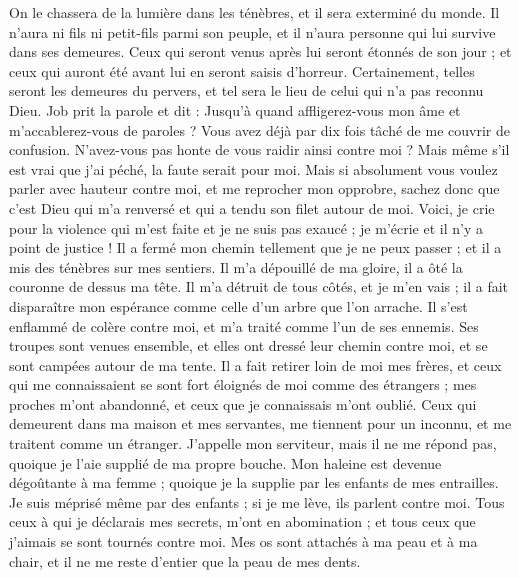 \begin{multicols}{2}
On le chassera de la lumière dans les ténèbres, et il sera exterminé du monde. 
Il n'aura ni fils ni petit-fils parmi son peuple, et il n'aura personne qui lui survive dans ses demeures. 
Ceux qui seront venus après lui seront étonnés de son jour ; et ceux qui auront été avant lui en seront saisis d'horreur. 
Certainement, telles seront les demeures du pervers, et tel sera le lieu de celui qui n'a pas reconnu Dieu.
\VerseOne{}Job prit la parole et dit :
Jusqu'à quand affligerez-vous mon âme et m'accablerez-vous de paroles ? 
Vous avez déjà par dix fois tâché de me couvrir de confusion. N'avez-vous pas honte de vous raidir ainsi contre moi ? 
Mais même s'il est vrai que j'ai péché, la faute serait pour moi. 
Mais si absolument vous voulez parler avec hauteur contre moi, et me reprocher mon opprobre, 
sachez donc que c'est Dieu qui m'a renversé et qui a tendu son filet autour de moi. 
Voici, je crie pour la violence qui m'est faite et je ne suis pas exaucé ; je m'écrie et il n'y a point de justice !
Il a fermé mon chemin tellement que je ne peux passer ; et il a mis des ténèbres sur mes sentiers. 
Il m'a dépouillé de ma gloire, il a ôté la couronne de dessus ma tête.
Il m'a détruit de tous côtés, et je m'en vais ; il a fait disparaître mon espérance comme celle d'un arbre que l'on arrache. 
Il s'est enflammé de colère contre moi, et m'a traité comme l'un de ses ennemis.
Ses troupes sont venues ensemble, et elles ont dressé leur chemin contre moi, et se sont campées autour de ma tente.
Il a fait retirer loin de moi mes frères, et ceux qui me connaissaient se sont fort éloignés de moi comme des étrangers ;
mes proches m'ont abandonné, et ceux que je connaissais m'ont oublié.
Ceux qui demeurent dans ma maison et mes servantes, me tiennent pour un inconnu, et me traitent comme un étranger. 
J'appelle mon serviteur, mais il ne me répond pas, quoique je l'aie supplié de ma propre bouche.
Mon haleine est devenue dégoûtante à ma femme ; quoique je la supplie par les enfants de mes entrailles.
Je suis méprisé même par des enfants ; si je me lève, ils parlent contre moi.
Tous ceux à qui je déclarais mes secrets, m'ont en abomination ; et tous ceux que j'aimais se sont tournés contre moi.
Mes os sont attachés à ma peau et à ma chair, et il ne me reste d'entier que la peau de mes dents.

\end{multicols}
